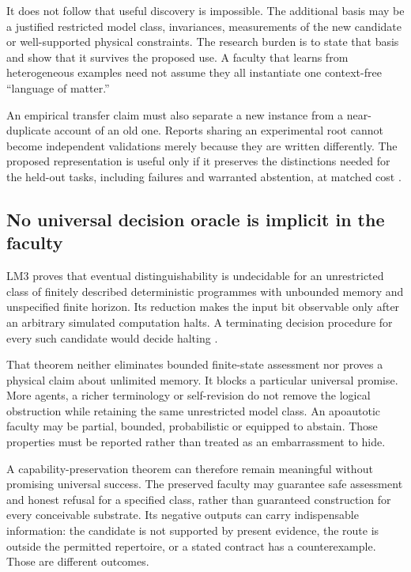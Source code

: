 It does not follow that useful discovery is impossible. The additional basis may be a justified restricted model class, invariances, measurements of the new candidate or well-supported physical constraints. The research burden is to state that basis and show that it survives the proposed use. A faculty that learns from heterogeneous examples need not assume they all instantiate one context-free ``language of matter.''

An empirical transfer claim must also separate a new instance from a near-duplicate account of an old one. Reports sharing an experimental root cannot become independent validations merely because they are written differently. The proposed representation is useful only if it preserves the distinctions needed for the held-out tasks, including failures and warranted abstention, at matched cost \cite[\S\S10.4,11.4,20.6]{LM3}.

\subsection{No universal decision oracle is implicit in the faculty}

LM3 proves that eventual distinguishability is undecidable for an unrestricted class of finitely described deterministic programmes with unbounded memory and unspecified finite horizon. Its reduction makes the input bit observable only after an arbitrary simulated computation halts. A terminating decision procedure for every such candidate would decide halting \cite[Theorem 17.2]{LM3}.

That theorem neither eliminates bounded finite-state assessment nor proves a physical claim about unlimited memory. It blocks a particular universal promise. More agents, a richer terminology or self-revision do not remove the logical obstruction while retaining the same unrestricted model class. An apoautotic faculty may be partial, bounded, probabilistic or equipped to abstain. Those properties must be reported rather than treated as an embarrassment to hide.

A capability-preservation theorem can therefore remain meaningful without promising universal success. The preserved faculty may guarantee safe assessment and honest refusal for a specified class, rather than guaranteed construction for every conceivable substrate. Its negative outputs can carry indispensable information: the candidate is not supported by present evidence, the route is outside the permitted repertoire, or a stated contract has a counterexample. Those are different outcomes.

